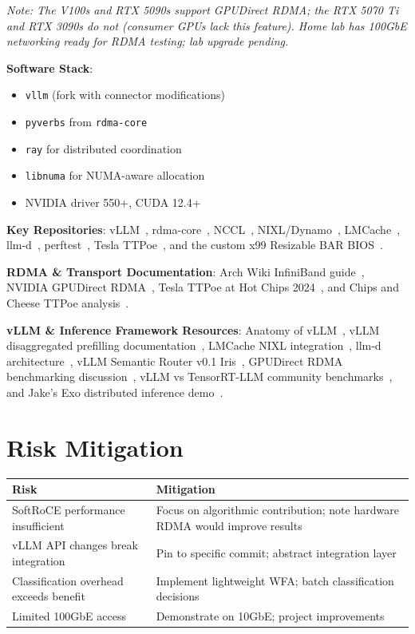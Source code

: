 \documentclass[10pt,letterpaper]{article}
\begin{document}
\textit{Note: The V100s and RTX 5090s support GPUDirect RDMA; the RTX 5070 Ti and RTX 3090s do not (consumer GPUs lack this feature). Home lab has 100GbE networking ready for RDMA testing; lab upgrade pending.}

\textbf{Software Stack}:
\begin{itemize}[noitemsep]
    \item \texttt{vllm} (fork with connector modifications)
    \item \texttt{pyverbs} from \texttt{rdma-core}
    \item \texttt{ray} for distributed coordination
    \item \texttt{libnuma} for NUMA-aware allocation
    \item NVIDIA driver 550+, CUDA 12.4+
\end{itemize}

\textbf{Key Repositories}: vLLM~\cite{vllm}, rdma-core~\cite{rdma-core}, NCCL~\cite{nccl}, NIXL/Dynamo~\cite{nixl}, LMCache~\cite{lmcache}, llm-d~\cite{llm-d}, perftest~\cite{perftest}, Tesla TTPoe~\cite{ttpoe-repo}, and the custom x99 Resizable BAR BIOS~\cite{x99-rebar}.

\textbf{RDMA \& Transport Documentation}: Arch Wiki InfiniBand guide~\cite{arch-ib}, NVIDIA GPUDirect RDMA~\cite{gpudirect-docs}, Tesla TTPoe at Hot Chips 2024~\cite{ttpoe-hotchips}, and Chips and Cheese TTPoe analysis~\cite{ttpoe-analysis}.

\textbf{vLLM \& Inference Framework Resources}: Anatomy of vLLM~\cite{anatomy-vllm}, vLLM disaggregated prefilling documentation~\cite{vllm-disagg}, LMCache NIXL integration~\cite{lmcache-nixl}, llm-d architecture~\cite{llm-d-arch}, vLLM Semantic Router v0.1 Iris~\cite{vllm-iris}, GPUDirect RDMA benchmarking discussion~\cite{gpudirect-bench}, vLLM vs TensorRT-LLM community benchmarks~\cite{vllm-vs-trt}, and Jake's Exo distributed inference demo~\cite{exo-demo}.

\section{Risk Mitigation}

\begin{table}[h]
\centering
\small
\begin{tabular}{@{}p{4cm}p{5cm}@{}}
\toprule
\textbf{Risk} & \textbf{Mitigation} \\
\midrule
SoftRoCE performance insufficient & Focus on algorithmic contribution; note hardware RDMA would improve results \\
vLLM API changes break integration & Pin to specific commit; abstract integration layer \\
Classification overhead exceeds benefit & Implement lightweight WFA; batch classification decisions \\
Limited 100GbE access & Demonstrate on 10GbE; project improvements \\
\bottomrule
\end{tabular}
\end{table}
\end{document}
